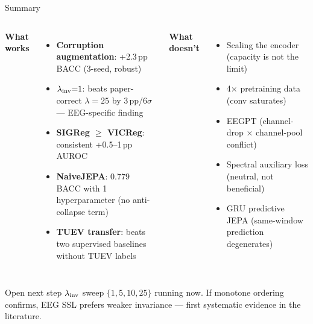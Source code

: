\documentclass[aspectratio=169,10pt]{beamer}
\begin{document}
\begin{frame}{Summary}

\begin{columns}[T]
\textbf{\textcolor{good}{What works}}
\begin{itemize}
  \item \textbf{Corruption augmentation}: +2.3\,pp BACC (3-seed, robust)
  \item \textbf{$\lambda_{\rm inv}{=}1$}: beats paper-correct $\lambda{=}25$ by 3\,pp/$6\sigma$ — EEG-specific finding
  \item \textbf{SIGReg $\geq$ VICReg}: consistent +0.5--1\,pp AUROC
  \item \textbf{NaiveJEPA}: 0.779 BACC with 1 hyperparameter (no anti-collapse term)
  \item \textbf{TUEV transfer}: beats two supervised baselines without TUEV labels
\end{itemize}

\textbf{\textcolor{warn}{What doesn't}}
\begin{itemize}
  \item Scaling the encoder (capacity is not the limit)
  \item 4$\times$ pretraining data (conv saturates)
  \item EEGPT (channel-drop $\times$ channel-pool conflict)
  \item Spectral auxiliary loss (neutral, not beneficial)
  \item GRU predictive JEPA (same-window prediction degenerates)
\end{itemize}
\end{columns}

\vspace{0.5em}
\begin{block}{Open next step}
$\lambda_{\rm inv}$ sweep $\{1,5,10,25\}$ running now. If monotone ordering confirms, EEG SSL prefers weaker invariance — first systematic evidence in the literature.
\end{block}
\end{frame}
\end{document}
